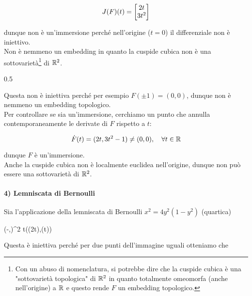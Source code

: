 \begin{equation}
	J(F)(t) = \bmqty{ 2t \\ 3t^{2} }
\end{equation}

dunque non è un'immersione perché nell'origine ($ t = 0 $) il differenziale non è iniettivo. \\
Non è nemmeno un embedding in quanto la cuspide cubica non è una sottovarietà\footnote{%
	Con un abuso di nomenclatura, si potrebbe dire che la cuspide cubica è una "sottovarietà topologica" di $ \mathbb{R}^{2} $ in quanto totalmente omeomorfa (anche nell'origine) a $ \mathbb{R} $ e questo rende $ F $ un embedding topologico.%
} di $ \mathbb{R}^{2} $.

	{0.5}{%
			}

Questa non è iniettiva perché per esempio $ F(\pm 1) = (0,0) $, dunque non è nemmeno un embedding topologico. \\
Per controllare se sia un'immersione, cerchiamo un punto che annulla contemporaneamente le derivate di $ F $ rispetto a $ t $:

\begin{equation}
	\dot{F}(t) = (2t, 3 t^{2} - 1) \neq (0,0) \qcomma \forall t \in \R
\end{equation}

dunque $ F $ è un'immersione. \\
Anche la cuspide cubica non è localmente euclidea nell'origine, dunque non può essere una sottovarietà di $ \mathbb{R}^{2} $.

\paragraph{4) Lemniscata di Bernoulli}
				
Sia l'applicazione della lemniscata di Bernoulli $ x^{2} = 4 y^{2} (1-y^{2}) $ (quartica)
				
	{(-\pi,\pi)}{\R^{2}}
	{t}{(\sin(2t),\sin(t))}


Questa è iniettiva perché per due punti dell'immagine uguali otteniamo che

